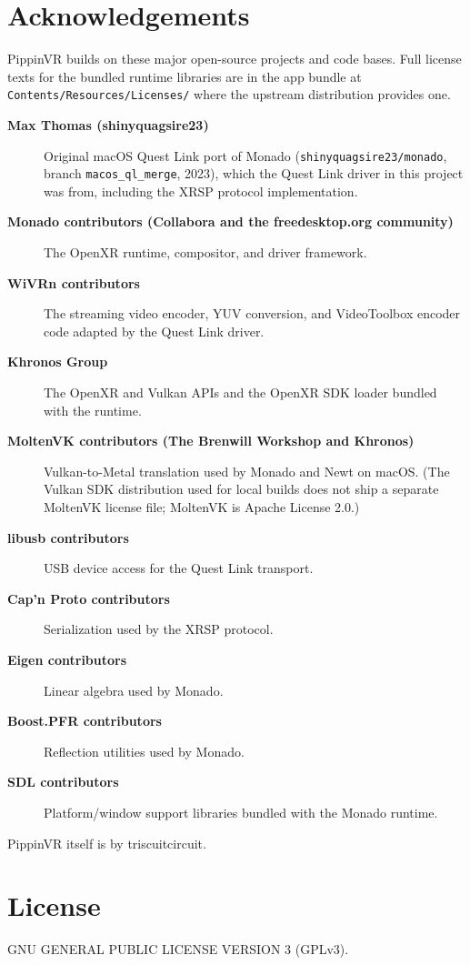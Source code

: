 \documentclass[11pt]{article}
\begin{document}
\section{Acknowledgements}
\label{sec:org7161a33}
PippinVR builds on these major open-source projects and code bases. Full
license texts for the bundled runtime libraries are in the app bundle at
\texttt{Contents/Resources/Licenses/} where the upstream distribution provides one.

\begin{description}
\item[{\textbf{Max Thomas (shinyquagsire23)}}] Original macOS Quest Link port of
Monado (\texttt{shinyquagsire23/monado}, branch \texttt{macos\_ql\_merge}, 2023), which
the Quest Link driver in this project was from, including the
XRSP protocol implementation.
\item[{\textbf{Monado contributors (Collabora and the freedesktop.org community)}}] The OpenXR runtime, compositor, and driver framework.
\item[{\textbf{WiVRn contributors}}] The streaming video encoder, YUV conversion,
and VideoToolbox encoder code adapted by the Quest Link driver.
\item[{\textbf{Khronos Group}}] The OpenXR and Vulkan APIs and the OpenXR SDK loader
bundled with the runtime.
\item[{\textbf{MoltenVK contributors (The Brenwill Workshop and Khronos)}}] Vulkan-to-Metal translation used by Monado and Newt on macOS. (The
Vulkan SDK distribution used for local builds does not ship a separate
MoltenVK license file; MoltenVK is Apache License 2.0.)
\item[{\textbf{libusb contributors}}] USB device access for the Quest Link transport.
\item[{\textbf{Cap'n Proto contributors}}] Serialization used by the XRSP protocol.
\item[{\textbf{Eigen contributors}}] Linear algebra used by Monado.
\item[{\textbf{Boost.PFR contributors}}] Reflection utilities used by Monado.
\item[{\textbf{SDL contributors}}] Platform/window support libraries bundled with
the Monado runtime.
\end{description}

PippinVR itself is by triscuitcircuit.
\section{License}
\label{sec:org194cf40}
GNU GENERAL PUBLIC LICENSE VERSION 3 (GPLv3).
\end{document}

